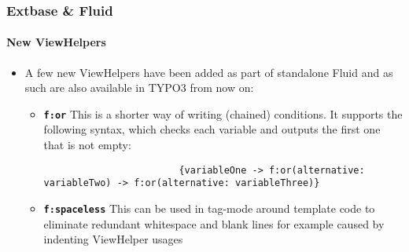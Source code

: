 \begin{frame}[fragile]
	\frametitle{Extbase \& Fluid}
	\framesubtitle{New ViewHelpers}

	\lstset{basicstyle=\tiny\ttfamily}

	\begin{itemize}
		\item A few new ViewHelpers have been added as part of standalone Fluid
			and as such are also available in TYPO3 from now on:

			\begin{itemize}

				\item \textbf{\texttt{f:or}}\newline
					This is a shorter way of writing (chained) conditions.
					It supports the following syntax, which checks each variable
					and outputs the first one that is not empty:

					\begin{lstlisting}
						{variableOne -> f:or(alternative: variableTwo) -> f:or(alternative: variableThree)}
					\end{lstlisting}

				\item \textbf{\texttt{f:spaceless}}\newline
					This can be used in tag-mode around template code to
					eliminate redundant whitespace and blank lines for example
					caused by indenting ViewHelper usages

			\end{itemize}

	\end{itemize}

\end{frame}

